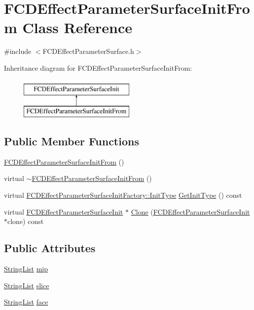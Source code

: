 \hypertarget{classFCDEffectParameterSurfaceInitFrom}{
\section{FCDEffectParameterSurfaceInitFrom Class Reference}
\label{classFCDEffectParameterSurfaceInitFrom}
}


{\ttfamily \#include $<$FCDEffectParameterSurface.h$>$}

Inheritance diagram for FCDEffectParameterSurfaceInitFrom:\begin{figure}[H]
\begin{center}
\leavevmode
\includegraphics[height=2.000000cm]{classFCDEffectParameterSurfaceInitFrom}
\end{center}
\end{figure}
\subsection*{Public Member Functions}
\begin{DoxyCompactItemize}
\item 
\hyperlink{classFCDEffectParameterSurfaceInitFrom_a308effcaf25b329f368d02f4efcc2ecb}{FCDEffectParameterSurfaceInitFrom} ()
\item 
virtual \hyperlink{classFCDEffectParameterSurfaceInitFrom_a3de6ed57df62c569a872995a95bce88f}{$\sim$FCDEffectParameterSurfaceInitFrom} ()
\item 
virtual \hyperlink{classFCDEffectParameterSurfaceInitFactory_a65e74f1159865702cac5236dd5d83892}{FCDEffectParameterSurfaceInitFactory::InitType} \hyperlink{classFCDEffectParameterSurfaceInitFrom_a33c2001f6d11fe519d7f5c492daec92a}{GetInitType} () const 
\item 
virtual \hyperlink{classFCDEffectParameterSurfaceInit}{FCDEffectParameterSurfaceInit} $\ast$ \hyperlink{classFCDEffectParameterSurfaceInitFrom_a8a173445b78914cf1ed6f222ffb7ba0b}{Clone} (\hyperlink{classFCDEffectParameterSurfaceInit}{FCDEffectParameterSurfaceInit} $\ast$clone) const 
\end{DoxyCompactItemize}
\subsection*{Public Attributes}
\begin{DoxyCompactItemize}
\item 
\hyperlink{classfm_1_1vector}{StringList} \hyperlink{classFCDEffectParameterSurfaceInitFrom_ac7df5eff72c2fa2a183bacdfc3ac3799}{mip}
\item 
\hyperlink{classfm_1_1vector}{StringList} \hyperlink{classFCDEffectParameterSurfaceInitFrom_a9abea30f2ccd2f28a50d5678d22135cb}{slice}
\item 
\hyperlink{classfm_1_1vector}{StringList} \hyperlink{classFCDEffectParameterSurfaceInitFrom_a78e6c19391ebf68c392be301db666ac8}{face}
\end{DoxyCompactItemize}


